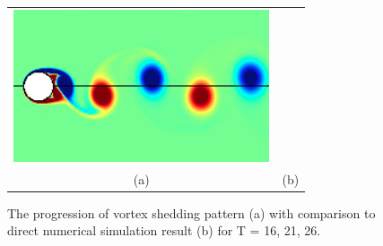 \begin{figure}
\begin{center}
\begin{tabular}{cc}
 \includegraphics[height=4.5cm]{./Figures/results/rotating/T_26.png}  \\
 (a) & (b) \\
 \end{tabular}
\end{center}
 \caption[Vortex shedding pattern around a sinusoidally rotating cylinder]{The progression of vortex shedding pattern (a) with comparison to direct numerical simulation result (b) for T = 16, 21, 26. }
 \label{fig:RotatingWake2}
\end{figure}

